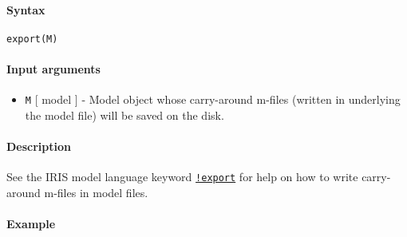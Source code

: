 


	\paragraph{Syntax}\label{syntax}

\begin{verbatim}
export(M)
\end{verbatim}

\paragraph{Input arguments}\label{input-arguments}

\begin{itemize}
\itemsep1pt\parskip0pt
\item
  \texttt{M} {[} model {]} - Model object whose carry-around m-files
  (written in underlying the model file) will be saved on the disk.
\end{itemize}

\paragraph{Description}\label{description}

See the IRIS model language keyword
\href{modellang/export}{\texttt{!export}} for help on how to write
carry-around m-files in model files.

\paragraph{Example}\label{example}


